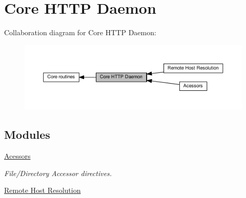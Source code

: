 \hypertarget{group__APACHE__CORE__HTTPD}{}\section{Core H\+T\+TP Daemon}
\label{group__APACHE__CORE__HTTPD}
Collaboration diagram for Core H\+T\+TP Daemon\+:
\nopagebreak
\begin{figure}[H]
\begin{center}
\leavevmode
\includegraphics[width=350pt]{group__APACHE__CORE__HTTPD}
\end{center}
\end{figure}
\subsection*{Modules}
\begin{DoxyCompactItemize}
\item 
\hyperlink{group__APACHE__CORE__HTTPD__ACESSORS}{Acessors}
\begin{DoxyCompactList}\small\item\em File/\+Directory Accessor directives. \end{DoxyCompactList}\item 
\hyperlink{group__get__remote__host}{Remote Host Resolution}
\end{DoxyCompactItemize}
